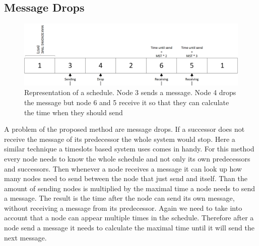 \subsection{Message Drops}
\begin{figure} [htbp]
	\centering         
    \includegraphics[scale=0.6]{content/images/MessageDrop}
    \caption{Representation of a schedule. Node 3 sends a message. Node 4 drops the message but node 6 and 5 receive it so that they can calculate the time when they should send}
    \label{fig:msgDrop}
\end{figure}
A problem of the proposed method are message drops. If a successor does not receive the message of its predecessor the whole system would stop. Here a similar technique a timeslots based system uses comes in handy. For this method every node needs to know the whole schedule and not only its own predecessors and successors. Then whenever a node receives a message it can look up how many nodes need to send between the node that just send and itself. Than the amount of sending nodes is multiplied by the maximal time a node needs to send a message. The result is the time after the node can send its own message, without receiving a message from its predecessor. Again we need to take into account that a node can appear multiple times in the schedule. Therefore after a node send a message it needs to calculate the maximal time until it will send the next message.

